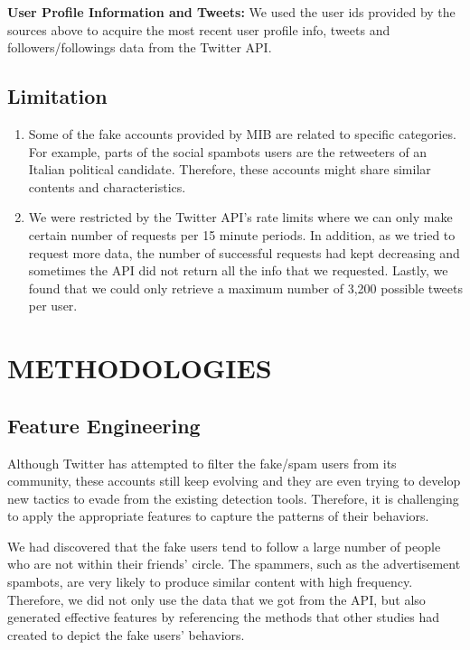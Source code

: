 \documentclass[a4paper, 12pt]{report}
\begin{document}
\noindent\textbf{User Profile Information and Tweets:} We used the user ids provided by the sources above to acquire the most recent user profile info, tweets and followers/followings data from the Twitter API.

\subsection*{Limitation}
\begin{enumerate}
	\item Some of the fake accounts provided by MIB are related to specific categories. For example, parts of the social spambots users are the retweeters of an Italian political candidate. Therefore, these accounts might share similar contents and characteristics.
	\item We were restricted by the Twitter API's rate limits where we can only make certain number of requests per 15 minute periods. In addition, as we tried to request more data, the number of successful requests had kept decreasing and sometimes the API did not return all the info that we requested. Lastly, we found that we could only retrieve a maximum number of 3,200 possible tweets per user. 
	
\end{enumerate}

\section*{METHODOLOGIES}
\subsection*{Feature Engineering}
Although Twitter has attempted to filter the fake/spam users from its community, these accounts still keep evolving and they are even trying to develop new tactics to evade from the existing detection tools. Therefore, it is challenging to apply the appropriate features to capture the patterns of their behaviors. \par

\noindent We had discovered that the fake users tend to follow a large number of people who are not within their friends' circle. The spammers, such as the advertisement spambots, are very likely to produce similar content with high frequency. Therefore, we did not only use the data that we got from the API, but also generated effective features by referencing the methods that other studies had created to depict the fake users' behaviors.
\end{document}
